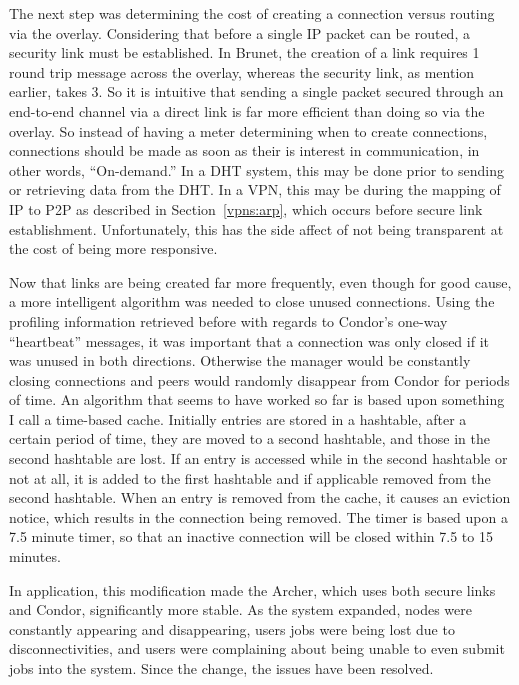 The next step was determining the cost of creating a connection versus routing
via the overlay.  Considering that before a single IP packet can be routed, a
security link must be established.  In Brunet, the creation of a link requires
1 round trip message across the overlay, whereas the security link, as mention
earlier, takes 3.  So it is intuitive that sending a single packet secured
through an end-to-end channel via a direct link is far more efficient than
doing so via the overlay.  So instead of having a meter determining when to
create connections, connections should be made as soon as their is interest in
communication, in other words, ``On-demand.''  In a DHT system, this may be done prior to sending or
retrieving data from the DHT.  In a VPN, this may be during the mapping of IP
to P2P as described in Section~\ref{vpns:arp}, which occurs before secure link
establishment.  Unfortunately, this has the side affect of not being
transparent at the cost of being more responsive.

Now that links are being created far more frequently, even though for good
cause, a more intelligent algorithm was needed to close unused connections.
Using the profiling information retrieved before with regards to Condor's
one-way ``heartbeat'' messages, it was important that a connection was only
closed if it was unused in both directions.  Otherwise the manager would be
constantly closing connections and peers would randomly disappear from Condor
for periods of time.  An algorithm that seems to have worked so far is based
upon something I call a time-based cache.  Initially entries are stored in a
hashtable, after a certain period of time, they are moved to a second
hashtable, and those in the second hashtable are lost.  If an entry is accessed
while in the second hashtable or not at all, it is added to the first hashtable
and if applicable removed from the second hashtable.  When an entry is removed
from the cache, it causes an eviction notice, which results in the connection
being removed.  The timer is based upon a 7.5 minute timer, so that an inactive
connection will be closed within 7.5 to 15 minutes.

In application, this modification made the Archer, which uses both secure links
and Condor, significantly more stable.  As the system expanded, nodes were
constantly appearing and disappearing, users jobs were being lost due to
disconnectivities, and users were complaining about being unable to even submit
jobs into the system.  Since the change, the issues have been resolved.

